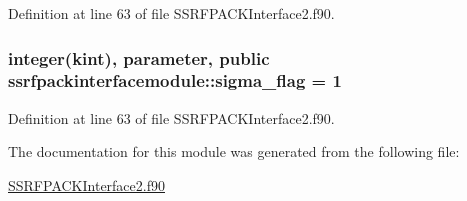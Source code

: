 Definition at line 63 of file S\+S\+R\+F\+P\+A\+C\+K\+Interface2.\+f90.

\hypertarget{classssrfpackinterfacemodule_aab9118e061bf334e412f174d571a0383}{
\subsubsection[{sigma\+\_\+flag}]{\setlength{\rightskip}{0pt plus 5cm}integer(kint), parameter, public ssrfpackinterfacemodule\+::sigma\+\_\+flag = 1}}\label{classssrfpackinterfacemodule_aab9118e061bf334e412f174d571a0383}


Definition at line 63 of file S\+S\+R\+F\+P\+A\+C\+K\+Interface2.\+f90.



The documentation for this module was generated from the following file\+:\begin{DoxyCompactItemize}
\item 
\hyperlink{SSRFPACKInterface2_8f90}{S\+S\+R\+F\+P\+A\+C\+K\+Interface2.\+f90}\end{DoxyCompactItemize}

